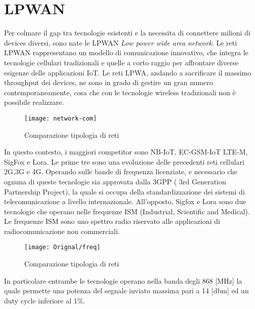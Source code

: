 \section{LPWAN}
Per colmare il gap tra tecnologie esistenti e la
necessita di connettere milioni di devices diversi, sono nate le  LPWAN
\emph{Low power wide area network}.
Le reti LPWAN rappresentano un modello  di comunicazione
innovativo, che integra le tecnologie cellulari tradizionali e quelle a corto
raggio per affrontare diverse esigenze delle applicazioni IoT. 
Le reti LPWA, andando a sacrificare il massimo throughput dei devices, ne sono in
grado di gestire un gran numero contemporaneamente, cosa che con le tecnologie
wireless tradizionali non è possibile realizzare.

\begin{figure}[ht]
    \centering 
        \texttt{[image: network-com]}
    \caption{Comparazione tipologia di reti}
\end{figure}

In questo contesto, i maggiori competitor sono  NB-IoT, EC-GSM-IoT
LTE-M, SigFox e Lora. Le prime tre  sono una evoluzione delle precedenti reti
cellulari 2G,3G e 4G. Operando sulle bande di frequenza licenziate, e necessario
che ognuna di queste tecnologie sia approvata dalla 3GPP ( 3rd Generation
Partnership Project), la quale si occupa della standardizzazione dei sistemi di
telecomunicazione a livello internazionale.
All'opposto, Sigfox e Lora sono due tecnologie che operano nelle frequenze ISM
(Industrial, Scientific and Medical). Le frequenze ISM sono uno spettro radio
riservato alle applicazioni di radiocomunicazione non commerciali.

\begin{figure}[ht]
    \centering 
        \texttt{[image: Orignal/freq]}
    \caption{Comparazione tipologia di reti}
\end{figure}

In particolare entrambe le tecnologie operano  nella banda degli 868 [MHz]
la quale permette una potenza del segnale inviato massima pari a 14 [dbm] ed un
duty cycle inferiore al 1\%.
 
